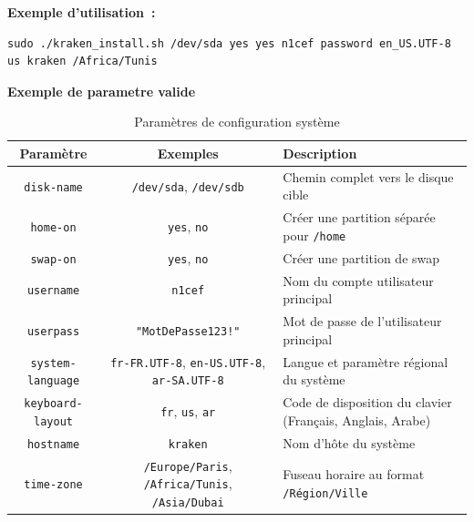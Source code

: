 \textbf{Exemple d'utilisation :}
\begin{lstlisting}
sudo ./kraken_install.sh /dev/sda yes yes n1cef password en_US.UTF-8 us kraken /Africa/Tunis
\end{lstlisting}



\textbf{Exemple de parametre valide }
\begin{table}[H]
    \centering
    \small
    \begin{tabularx}{\textwidth}{|c|c|X|}
        \hline
        \textbf{Paramètre} & \textbf{Exemples} & \textbf{Description} \\
        \hline
        \texttt{disk-name} & \texttt{/dev/sda}, \texttt{/dev/sdb} & Chemin complet vers le disque cible \\
        \hline
        \texttt{home-on} & \texttt{yes}, \texttt{no} & Créer une partition séparée pour \texttt{/home} \\
        \hline
        \texttt{swap-on} & \texttt{yes}, \texttt{no} & Créer une partition de swap \\
        \hline
        \texttt{username} & \texttt{n1cef} & Nom du compte utilisateur principal  \\
        \hline
        \texttt{userpass} & \texttt{"MotDePasse123!"} & Mot de passe de l'utilisateur principal  \\
        \hline
        \texttt{system-language} & \texttt{fr-FR.UTF-8}, \texttt{en-US.UTF-8}, \texttt{ar-SA.UTF-8} & Langue et paramètre régional du système \\
        \hline
        \texttt{keyboard-layout} & \texttt{fr}, \texttt{us}, \texttt{ar} & Code de disposition du clavier (Français, Anglais, Arabe) \\
        \hline
        \texttt{hostname} & \texttt{kraken} & Nom d'hôte du système  \\
        \hline
        \texttt{time-zone} & \texttt{/Europe/Paris}, \texttt{/Africa/Tunis}, \texttt{/Asia/Dubai} & Fuseau horaire au format \texttt{/Région/Ville} \\
        \hline
    \end{tabularx}
    \caption{Paramètres de configuration système}
    \label{tab:system-config-params}
\end{table}





